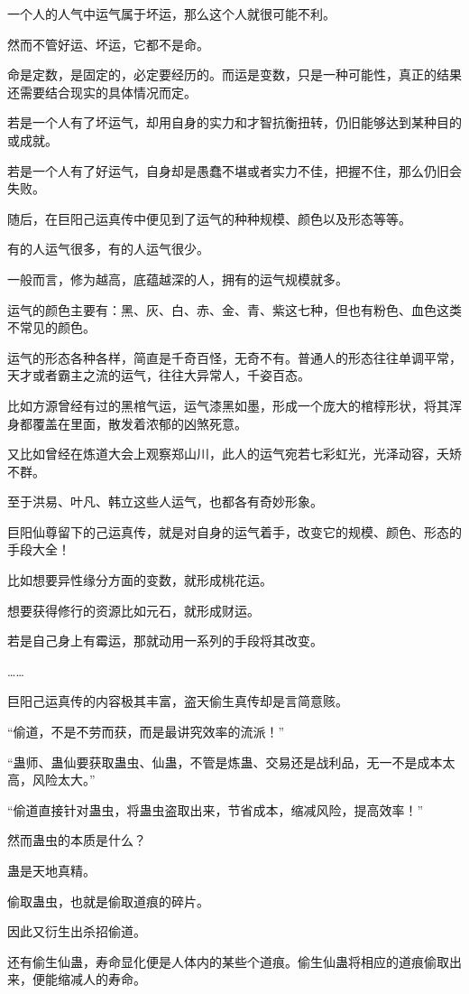 \begin{this_body}
一个人的人气中运气属于坏运，那么这个人就很可能不利。

然而不管好运、坏运，它都不是命。

命是定数，是固定的，必定要经历的。而运是变数，只是一种可能性，真正的结果还需要结合现实的具体情况而定。

若是一个人有了坏运气，却用自身的实力和才智抗衡扭转，仍旧能够达到某种目的或成就。

若是一个人有了好运气，自身却是愚蠢不堪或者实力不佳，把握不住，那么仍旧会失败。

随后，在巨阳己运真传中便见到了运气的种种规模、颜色以及形态等等。

有的人运气很多，有的人运气很少。

一般而言，修为越高，底蕴越深的人，拥有的运气规模就多。

运气的颜色主要有：黑、灰、白、赤、金、青、紫这七种，但也有粉色、血色这类不常见的颜色。

运气的形态各种各样，简直是千奇百怪，无奇不有。普通人的形态往往单调平常，天才或者霸主之流的运气，往往大异常人，千姿百态。

比如方源曾经有过的黑棺气运，运气漆黑如墨，形成一个庞大的棺椁形状，将其浑身都覆盖在里面，散发着浓郁的凶煞死意。

又比如曾经在炼道大会上观察郑山川，此人的运气宛若七彩虹光，光泽动容，夭矫不群。

至于洪易、叶凡、韩立这些人运气，也都各有奇妙形象。

巨阳仙尊留下的己运真传，就是对自身的运气着手，改变它的规模、颜色、形态的手段大全！

比如想要异性缘分方面的变数，就形成桃花运。

想要获得修行的资源比如元石，就形成财运。

若是自己身上有霉运，那就动用一系列的手段将其改变。

……

巨阳己运真传的内容极其丰富，盗天偷生真传却是言简意赅。

“偷道，不是不劳而获，而是最讲究效率的流派！”

“蛊师、蛊仙要获取蛊虫、仙蛊，不管是炼蛊、交易还是战利品，无一不是成本太高，风险太大。”

“偷道直接针对蛊虫，将蛊虫盗取出来，节省成本，缩减风险，提高效率！”

然而蛊虫的本质是什么？

蛊是天地真精。

偷取蛊虫，也就是偷取道痕的碎片。

因此又衍生出杀招偷道。

还有偷生仙蛊，寿命显化便是人体内的某些个道痕。偷生仙蛊将相应的道痕偷取出来，便能缩减人的寿命。


\end{this_body}
